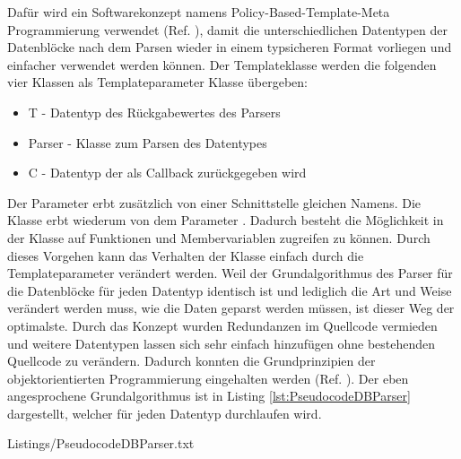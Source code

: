 Daf{\"u}r wird ein Softwarekonzept namens Policy-Based-Template-Meta Programmierung
verwendet (Ref. \cite{Alexandrescu:2001:MCD:377789}), damit die unterschiedlichen Datentypen der Datenbl{\"o}cke nach dem Parsen wieder in einem typsicheren Format vorliegen und
einfacher verwendet werden k{\"o}nnen.
Der Templateklasse werden die folgenden vier Klassen als Templateparameter
Klasse {\"u}bergeben:

\begin{itemize}
\item T - Datentyp des R{\"u}ckgabewertes des Parsers
\item Parser - Klasse zum Parsen des Datentypes
\item C - Datentyp der als Callback zur{\"u}ckgegeben wird
\end{itemize}

Der Parameter  erbt zus{\"a}tzlich von einer
Schnittstelle gleichen Namens. Die Klasse  erbt
wiederum von dem Parameter .
Dadurch besteht die M{\"o}glichkeit in der Klasse auf Funktionen und
Membervariablen zugreifen zu k{\"o}nnen.
Durch dieses Vorgehen kann das Verhalten der Klasse einfach durch die
Templateparameter ver{\"a}ndert werden. Weil der Grundalgorithmus des Parser f{\"u}r
die Datenbl{\"o}cke f{\"u}r jeden Datentyp identisch ist und lediglich die Art und
Weise ver{\"a}ndert werden muss, wie die Daten geparst werden m{\"u}ssen,
ist dieser Weg der optimalste. Durch das Konzept wurden
Redundanzen im Quellcode vermieden und weitere Datentypen lassen sich
sehr einfach hinzuf{\"u}gen ohne bestehenden Quellcode zu ver{\"a}ndern. Dadurch konnten
die Grundprinzipien der objektorientierten Programmierung eingehalten werden (Ref. \cite{herold2001go}).
Der eben angesprochene Grundalgorithmus ist in Listing 
\ref{lst:PseudocodeDBParser} dargestellt, welcher f{\"u}r jeden Datentyp
durchlaufen wird.

\lstset{language=pseudo}
\lstset{commentstyle=\textit}
{Listings/PseudocodeDBParser.txt}
